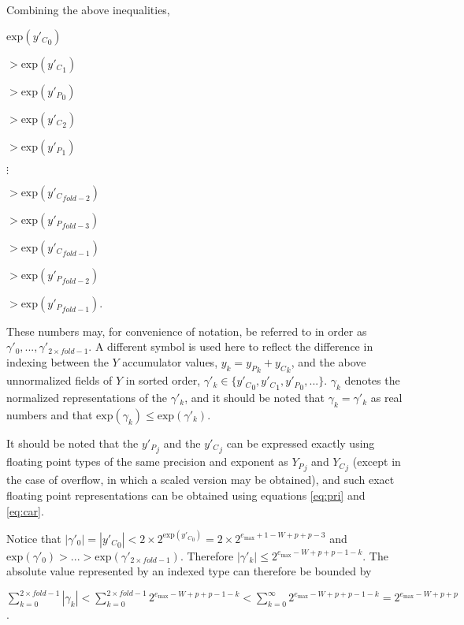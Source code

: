 \documentclass[12pt]{article}
\providecommand{\exp}{\ensuremath{\text{exp}}}
\providecommand{\max}{\ensuremath{\text{max}}}
\theoremstyle{plain}
\begin{document}
    Combining the above inequalities,

    \indent\indent $\exp({y'_C}_0)$

    \indent\indent $ > \exp({y'_C}_1)$

    \indent\indent $ > \exp({y'_P}_0)$

    \indent\indent $ > \exp({y'_C}_2)$

    \indent\indent $ > \exp({y'_P}_1)$

    \indent\indent $ \vdots$

    \indent\indent $ > \exp({y'_C}_{fold - 2})$

    \indent\indent $ > \exp({y'_P}_{fold - 3})$

    \indent\indent $ > \exp({y'_C}_{fold - 1})$

    \indent\indent $ > \exp({y'_P}_{fold - 2})$

    \indent\indent $ > \exp({y'_P}_{fold - 1})$.

    These numbers may, for convenience of notation, be referred to in order as $\gamma'_0, ..., \gamma'_{2 \times fold - 1}$. A different symbol is used here to reflect the difference in indexing between the $Y$ accumulator values, $y_k = {y_P}_k + {y_C}_k$, and the above unnormalized fields of $Y$ in sorted order, $\gamma'_k \in \{{y'_C}_0, {y'_C}_1, {y'_P}_0, ...\}$.
    $\gamma_k$ denotes the normalized representations of the $\gamma'_k$, and it should be noted that $\gamma_k = \gamma'_k$ as real numbers and that $\exp(\gamma_k) \leq \exp(\gamma'_k)$.

    It should be noted that the ${y'_P}_j$ and the ${y'_C}_j$ can be expressed exactly using floating point types of the same precision and exponent as ${Y_P}_j$ and ${Y_C}_j$ (except in the case of overflow, in which a scaled version may be obtained), and such exact floating point representations can be obtained using equations \ref{eq:pri} and \ref{eq:car}.

    Notice that $|\gamma'_0| = |{y'_C}_0| < 2 \times 2^{\exp({y'_C}_0)} = 2 \times 2^{e_{\max} + 1 - W + p + p - 3}$ and $\exp(\gamma'_0) > ... > \exp(\gamma'_{2 \times fold - 1})$.  Therefore $|\gamma'_k| \leq 2^{e_{\max} - W + p + p - 1 - k}$. The absolute value represented by an indexed type can therefore be bounded by

    $\sum\limits_{k = 0}^{2 \times fold - 1} |\gamma_k| < \sum\limits_{k = 0}^{2 \times fold - 1} 2^{e_{\max} - W + p + p - 1 - k} < \sum\limits_{k = 0}^{\infty} 2^{e_{\max} - W + p + p - 1 - k} = 2^{e_{\max} - W + p + p}$.
\end{document}
